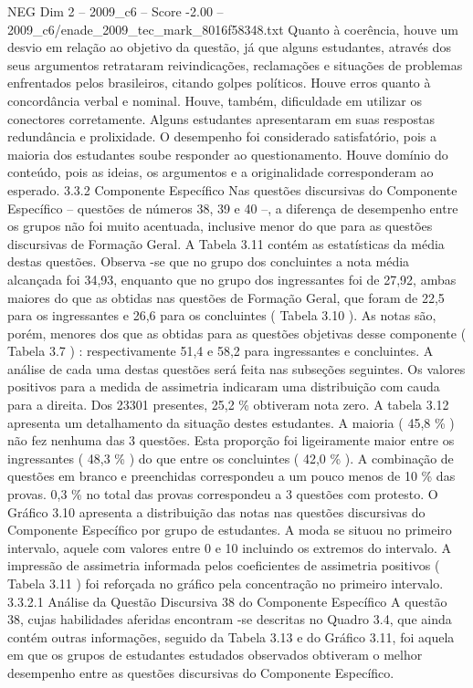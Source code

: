 \begin{textsample}{NEG Dim 2 – 2009\_c6 – Score -2.00 – 2009\_c6/enade\_2009\_tec\_mark\_8016f58348.txt}
Quanto à coerência, houve um desvio em relação ao objetivo da questão, já que alguns estudantes, através dos seus argumentos retrataram reivindicações, reclamações e situações de problemas enfrentados pelos brasileiros, citando golpes políticos.
Houve erros quanto à concordância verbal e nominal.
Houve, também, dificuldade em utilizar os conectores corretamente.
Alguns estudantes apresentaram em suas respostas redundância e prolixidade.
O desempenho foi considerado satisfatório, pois a maioria dos estudantes soube responder ao questionamento.
Houve domínio do conteúdo, pois as ideias, os argumentos e a originalidade corresponderam ao esperado. 3.3.2 Componente Específico Nas questões discursivas do Componente Específico – questões de números 38, 39 e 40 –, a diferença de desempenho entre os grupos não foi muito acentuada, inclusive menor do que para as questões discursivas de Formação Geral.
A Tabela 3.11 contém as estatísticas da média destas questões.
Observa -se que no grupo dos concluintes a nota média alcançada foi 34,93, enquanto que no grupo dos ingressantes foi de 27,92, ambas maiores do que as obtidas nas questões de Formação Geral, que foram de 22,5 para os ingressantes e 26,6 para os concluintes ( Tabela 3.10 ).
As notas são, porém, menores dos que as obtidas para as questões objetivas desse componente ( Tabela 3.7 ) : respectivamente 51,4 e 58,2 para ingressantes e concluintes.
A análise de cada uma destas questões será feita nas subseções seguintes.
Os valores positivos para a medida de assimetria indicaram uma distribuição com cauda para a direita.
Dos 23301 presentes, 25,2 \% obtiveram nota zero.
A tabela 3.12 apresenta um detalhamento da situação destes estudantes.
A maioria ( 45,8 \% ) não fez nenhuma das 3 questões.
Esta proporção foi ligeiramente maior entre os ingressantes ( 48,3 \% ) do que entre os concluintes ( 42,0 \% ).
A combinação de questões em branco e preenchidas correspondeu a um pouco menos de 10 \% das provas. 0,3 \% no total das provas correspondeu a 3 questões com protesto.
O Gráfico 3.10 apresenta a distribuição das notas nas questões discursivas do Componente Específico por grupo de estudantes.
A moda se situou no primeiro intervalo, aquele com valores entre 0 e 10 incluindo os extremos do intervalo.
A impressão de assimetria informada pelos coeficientes de assimetria positivos ( Tabela 3.11 ) foi reforçada no gráfico pela concentração no primeiro intervalo. 3.3.2.1 Análise da Questão Discursiva 38 do Componente Específico A questão 38, cujas habilidades aferidas encontram -se descritas no Quadro 3.4, que ainda contém outras informações, seguido da Tabela 3.13 e do Gráfico 3.11, foi aquela em que os grupos de estudantes estudados observados obtiveram o melhor desempenho entre as questões discursivas do Componente Específico.

\end{textsample}
